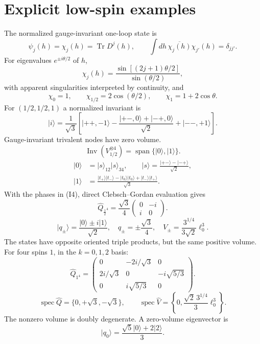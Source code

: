 \documentclass[11pt,a4paper]{article}
\newcommand{\ket}[1]{\lvert #1\rangle}
\newcommand{\Inv}{\operatorname{Inv}}
\newcommand{\Tr}{\operatorname{Tr}}
\newcommand{\eq}[2]{\begin{equation}#2\tag{#1}\end{equation}}
\begin{document}
\section{Explicit low-spin examples}
The normalized gauge-invariant one-loop state is
\eq{L1}{\psi_j(h)=\chi_j(h)=\Tr D^j(h),\qquad\int dh\,\overline{\chi_j(h)}\chi_{j'}(h)=\delta_{jj'}.}
For eigenvalues $e^{\pm i\theta/2}$ of $h$,
\eq{L2}{\chi_j(h)=\frac{\sin[(2j+1)\theta/2]}{\sin(\theta/2)},}
with apparent singularities interpreted by continuity, and
\eq{L3}{\chi_0=1,\qquad\chi_{1/2}=2\cos(\theta/2),\qquad\chi_1=1+2\cos\theta.}
For $(1/2,1/2,1)$ a normalized invariant is
\eq{L4}{\ket{i}=\frac1{\sqrt3}\left[\ket{++,-1}-\frac{\ket{+-,0}+\ket{-+,0}}{\sqrt2}+\ket{--,+1}\right].}
Gauge-invariant trivalent nodes have zero volume.
\eq{L5}{\Inv(V_{1/2}^{\otimes4})=\operatorname{span}\{\ket0,\ket1\}.}
\eq{L6}{\begin{aligned}
\ket0&=\ket{s}_{12}\ket{s}_{34},\qquad\ket{s}=\frac{\ket{+-}-\ket{-+}}{\sqrt2},\\
\ket1&=\frac{\ket{t_+}\ket{t_-}-\ket{t_0}\ket{t_0}+\ket{t_-}\ket{t_+}}{\sqrt3}.
\end{aligned}}
With the phases in (I4), direct Clebsch--Gordan evaluation gives
\eq{L7}{\hat Q_{\frac12^4}=\frac{\sqrt3}{4}\begin{pmatrix}0&-i\\i&0\end{pmatrix}.}
\eq{L8}{\ket{q_\pm}=\frac{\ket0\pm i\ket1}{\sqrt2},\quad q_\pm=\pm\frac{\sqrt3}{4},\quad V_\pm=\frac{3^{1/4}}{3\sqrt2}\ell_0^3.}
The states have opposite oriented triple products, but the same positive volume.
For four spins $1$, in the $k=0,1,2$ basis:
\eq{L9}{\hat Q_{1^4}=\begin{pmatrix}0&-2i/\sqrt3&0\\2i/\sqrt3&0&-i\sqrt{5/3}\\0&i\sqrt{5/3}&0\end{pmatrix}.}
\eq{L10}{\operatorname{spec}\hat Q=\{0,+\sqrt3,-\sqrt3\},\qquad\operatorname{spec}\hat V=\left\{0,\frac{\sqrt2\,3^{1/4}}3\ell_0^3\right\}.}
The nonzero volume is doubly degenerate. A zero-volume eigenvector is
\eq{L11}{\ket{q_0}=\frac{\sqrt5\ket0+2\ket2}{3}.}
\end{document}
